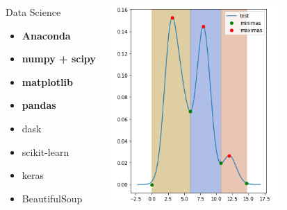 \documentclass{beamer}
\begin{document}
\begin{frame}
\begin{center}
\begin{columns}[onlytextwidth,T]
\column{\dimexpr\linewidth-65mm-5mm}
\begin{block}{Data Science}
\begin{itemize}
\item \textbf{Anaconda}
\item \textbf{numpy + scipy}
\item \textbf{matplotlib}
\item \textbf{pandas}
\item dask
\item scikit-learn
\item keras
\item BeautifulSoup
\end{itemize}
\end{block}
\column{65mm}
\includegraphics[width=65mm]{./assets/pyplot.png}
\end{columns}
\end{center}
\end{frame}
\end{document}

